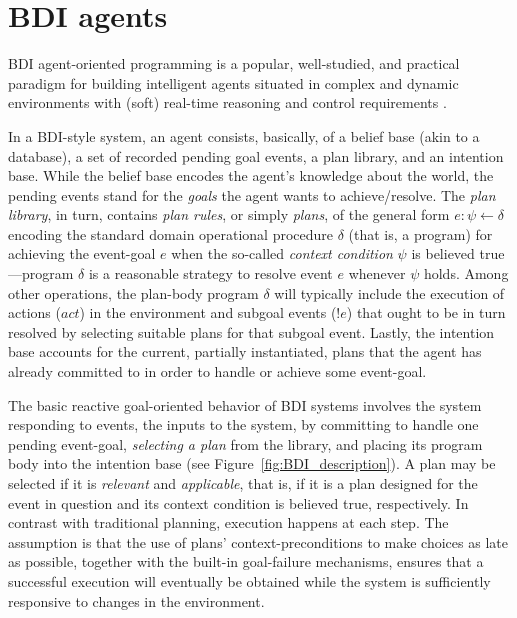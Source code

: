 \documentclass{article}
\begin{document}
\section{BDI agents}

BDI agent-oriented programming is a popular, well-studied, and
practical paradigm for building intelligent agents situated in complex
and dynamic environments with (soft) real-time reasoning and control
requirements \cite{Georgeff89-PRS,Benfield:AAMAS06}.

In a BDI-style system, an agent consists, basically, of a belief base
(akin to a database), a set of recorded pending goal events, a plan
library, and an intention base. While the belief base encodes the
agent's knowledge about the world, the pending events stand for the
\emph{goals} the agent wants to achieve/resolve.
The \textit{plan library}, in turn, contains \emph{plan rules}, or simply
\emph{plans}, of the general form $e: \psi \leftarrow \delta$ encoding the
standard domain operational procedure $\delta$ (that is, a program) for achieving
the event-goal $e$ when the so-called \textit{context condition} $\psi$ is
believed true---program $\delta$ is a reasonable strategy to resolve event $e$
whenever $\psi$ holds. Among other operations, the plan-body program $\delta$
will typically include the execution of actions ($act$) in the environment and
subgoal events ($!e$) that ought to be in turn resolved by selecting suitable
plans for that subgoal event. Lastly, the intention base accounts for the
current, partially instantiated, plans that the agent has already committed to in
order to handle or achieve some event-goal.


The basic reactive goal-oriented behavior of BDI systems involves the system
responding to events, the inputs to the system, by committing to handle one
pending event-goal, \textit{selecting a plan} from the library, and placing its
program body  into the intention base (see Figure~\ref{fig:BDI_description}).
A plan may be selected if it is \textit{relevant} and \textit{applicable}, that is, if it
is a plan designed for the event in question and its context condition is
believed true, respectively.
In contrast with traditional planning, execution happens at each step. The
assumption is that the use of plans' context-preconditions to make choices as
late as possible, together with the built-in goal-failure mechanisms, ensures
that a successful execution will eventually be obtained while the system is
sufficiently responsive to changes in the environment.
\end{document}
